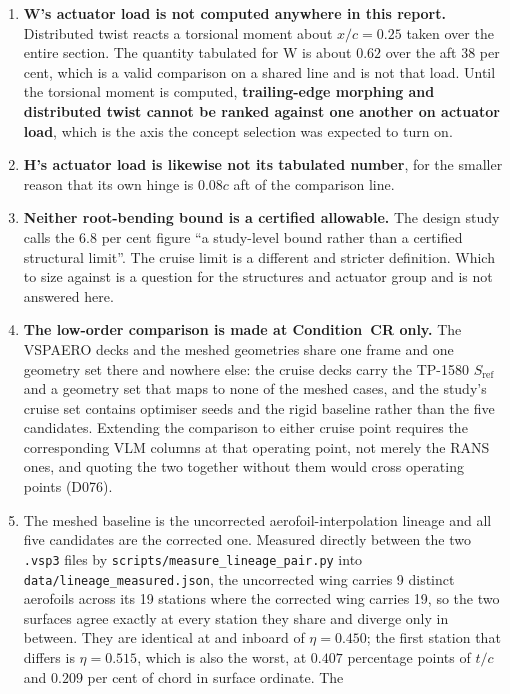 \begin{enumerate}
  \item \textbf{W's actuator load is not computed anywhere in this report.} Distributed twist
    reacts a torsional moment about $x/c = 0.25$ taken over the entire section. The quantity
    tabulated for W is about $0.62$ over the aft $38$ per cent, which is a valid comparison on a
    shared line and is not that load. Until the torsional moment is computed, \textbf{trailing-edge
    morphing and distributed twist cannot be ranked against one another on actuator load}, which is
    the axis the concept selection was expected to turn on.
  \item \textbf{H's actuator load is likewise not its tabulated number}, for the smaller reason
    that its own hinge is $0.08c$ aft of the comparison line.
  \item \textbf{Neither root-bending bound is a certified allowable.} The design study calls the
    $6.8$ per cent figure ``a study-level bound rather than a certified structural limit''. The
    cruise limit is a different and stricter definition. Which to size against is a question for
    the structures and actuator group and is not answered here.
  \item \textbf{The low-order comparison is made at Condition~CR only.} The VSPAERO decks and the
    meshed geometries share one frame and one geometry set there and nowhere else: the cruise
    decks carry the TP-1580 $S_\mathrm{ref}$ and a geometry set that maps to none of the meshed
    cases, and the study's cruise set contains optimiser seeds and the rigid baseline rather than
    the five candidates. Extending the comparison to either cruise point requires the
    corresponding VLM columns at that operating point, not merely the RANS ones, and quoting the
    two together without them would cross operating points (D076).
\item The meshed baseline is the uncorrected aerofoil-interpolation lineage and all five
candidates are the corrected one. Measured directly between the two \texttt{.vsp3} files
by \texttt{scripts/measure\_lineage\_pair.py} into \texttt{data/lineage\_measured.json},
the uncorrected wing carries 9 distinct aerofoils across its 19
stations where the corrected wing carries 19, so the two surfaces agree exactly at every
station they share and diverge only in between. They are identical at and inboard of
$\eta = 0.450$; the first station that differs is $\eta = 0.515$, which is also the worst,
at $0.407$ percentage points of $t/c$ and $0.209$ per cent of chord in surface ordinate. The

\end{enumerate}
